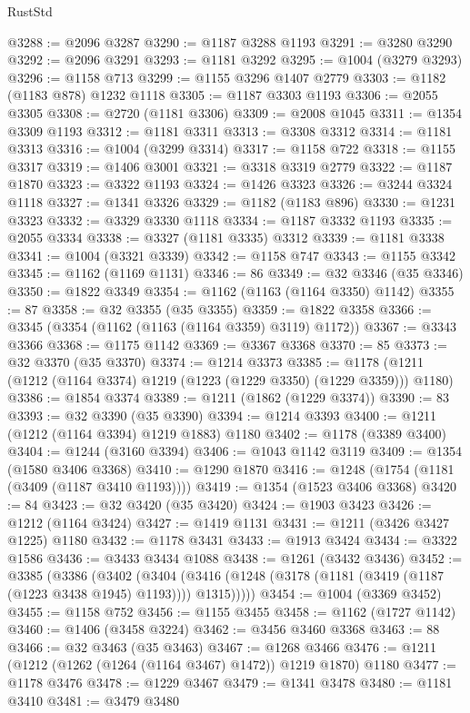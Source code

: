 \begin{lexlean}{RustStd}
\begin{coremodule}
@3288 := @2096 @3287
@3290 := @1187 @3288 @1193
@3291 := @3280 @3290
@3292 := @2096 @3291
@3293 := @1181 @3292
@3295 := @1004 (@3279 @3293)
@3296 := @1158 @713
@3299 := @1155 @3296 @1407 @2779
@3303 := @1182 (@1183 @878) @1232 @1118
@3305 := @1187 @3303 @1193
@3306 := @2055 @3305
@3308 := @2720 (@1181 @3306)
@3309 := @2008 @1045
@3311 := @1354 @3309 @1193
@3312 := @1181 @3311
@3313 := @3308 @3312
@3314 := @1181 @3313
@3316 := @1004 (@3299 @3314)
@3317 := @1158 @722
@3318 := @1155 @3317
@3319 := @1406 @3001
@3321 := @3318 @3319 @2779
@3322 := @1187 @1870
@3323 := @3322 @1193
@3324 := @1426 @3323
@3326 := @3244 @3324 @1118
@3327 := @1341 @3326
@3329 := @1182 (@1183 @896)
@3330 := @1231 @3323
@3332 := @3329 @3330 @1118
@3334 := @1187 @3332 @1193
@3335 := @2055 @3334
@3338 := @3327 (@1181 @3335) @3312
@3339 := @1181 @3338
@3341 := @1004 (@3321 @3339)
@3342 := @1158 @747
@3343 := @1155 @3342
@3345 := @1162 (@1169 @1131)
@3346 := 86
@3349 := @32 @3346 (@35 @3346)
@3350 := @1822 @3349
@3354 := @1162 (@1163 (@1164 @3350) @1142)
@3355 := 87
@3358 := @32 @3355 (@35 @3355)
@3359 := @1822 @3358
@3366 := @3345 (@3354 (@1162 (@1163 (@1164 @3359) @3119) @1172))
@3367 := @3343 @3366
@3368 := @1175 @1142
@3369 := @3367 @3368
@3370 := 85
@3373 := @32 @3370 (@35 @3370)
@3374 := @1214 @3373
@3385 := @1178 (@1211 (@1212 (@1164 @3374) @1219 (@1223 (@1229 @3350) (@1229 @3359))) @1180)
@3386 := @1854 @3374
@3389 := @1211 (@1862 (@1229 @3374))
@3390 := 83
@3393 := @32 @3390 (@35 @3390)
@3394 := @1214 @3393
@3400 := @1211 (@1212 (@1164 @3394) @1219 @1883) @1180
@3402 := @1178 (@3389 @3400)
@3404 := @1244 (@3160 @3394)
@3406 := @1043 @1142 @3119
@3409 := @1354 (@1580 @3406 @3368)
@3410 := @1290 @1870
@3416 := @1248 (@1754 (@1181 (@3409 (@1187 @3410 @1193))))
@3419 := @1354 (@1523 @3406 @3368)
@3420 := 84
@3423 := @32 @3420 (@35 @3420)
@3424 := @1903 @3423
@3426 := @1212 (@1164 @3424)
@3427 := @1419 @1131
@3431 := @1211 (@3426 @3427 @1225) @1180
@3432 := @1178 @3431
@3433 := @1913 @3424
@3434 := @3322 @1586
@3436 := @3433 @3434 @1088
@3438 := @1261 (@3432 @3436)
@3452 := @3385
    (@3386
      (@3402
        (@3404 (@3416 (@1248 (@3178 (@1181 (@3419 (@1187 (@1223 @3438 @1945) @1193)))) @1315)))))
@3454 := @1004 (@3369 @3452)
@3455 := @1158 @752
@3456 := @1155 @3455
@3458 := @1162 (@1727 @1142)
@3460 := @1406 (@3458 @3224)
@3462 := @3456 @3460 @3368
@3463 := 88
@3466 := @32 @3463 (@35 @3463)
@3467 := @1268 @3466
@3476 := @1211 (@1212 (@1262 (@1264 (@1164 @3467) @1472)) @1219 @1870) @1180
@3477 := @1178 @3476
@3478 := @1229 @3467
@3479 := @1341 @3478
@3480 := @1181 @3410
@3481 := @3479 @3480

\end{coremodule}
\end{lexlean}
